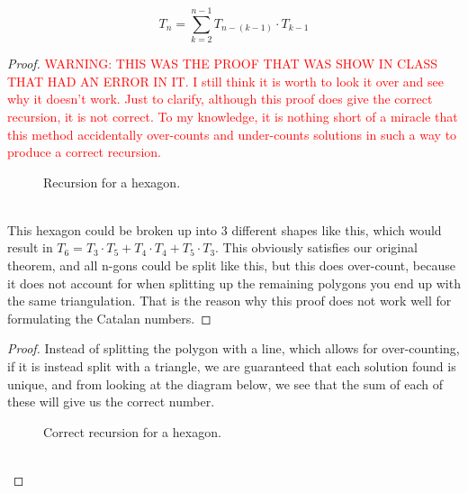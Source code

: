 \begin{theorem}
	$$T_n = \sum_{k=2}^{n-1}T_{n-(k-1)}\cdot T_{k-1}$$
\end{theorem}
\begin{proof}
	\textcolor{red}{WARNING: THIS WAS THE PROOF THAT WAS SHOW IN CLASS THAT HAD AN ERROR IN IT. I still think it is worth to look it over and see why it doesn't work. Just to clarify, although this proof does give the correct recursion, it is not correct. To my knowledge, it is nothing short of a miracle that this method accidentally over-counts and under-counts solutions in such a way to produce a correct recursion.}
	\begin{figure}[h]
        \caption{Recursion for a hexagon.}
        \label{fig:hex1}
    \end{figure}\\
    This hexagon could be broken up into 3 different shapes like this, which would result in $T_6 = T_3\cdot T_5 + T_4\cdot T_4 + T_5\cdot T_3$. This obviously satisfies our original theorem, and all n-gons could be split like this, but this does over-count, because it does not account for when splitting up the remaining polygons you end up with the same triangulation. That is the reason why this proof does not work well for formulating the Catalan numbers.
\end{proof}
\begin{proof}
    Instead of splitting the polygon with a line, which allows for over-counting, if it is instead split with a triangle, we are guaranteed that each solution found is unique, and from looking at the diagram below, we see that the sum of each of these will give us the correct number.
    \begin{figure}[h]
        \caption{Correct recursion for a hexagon.}
        \label{fig:hex2}
    \end{figure}\\
\end{proof}



